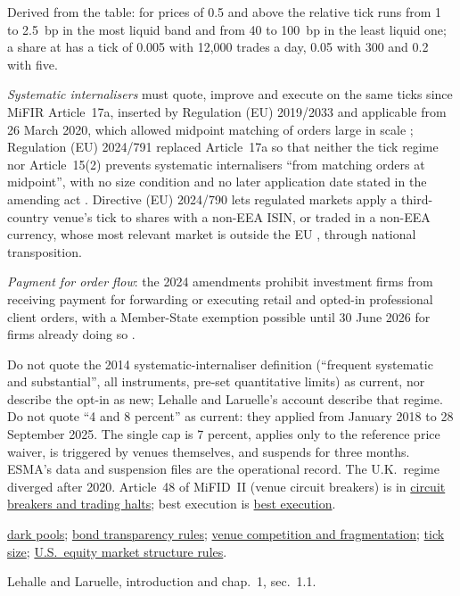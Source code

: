 \begin{qfrule}
Derived from the table: for prices of 0.5 and above the relative tick runs from 1 to 2.5~bp in the most liquid band and from 40 to 100~bp in the least liquid one; a share at  has a tick of 0.005 with 12{,}000 trades a day, 0.05 with 300 and 0.2 with five.

\emph{Systematic internalisers} must quote, improve and execute on the same ticks since MiFIR Article~17a, inserted by Regulation (EU) 2019/2033 and applicable from 26 March 2020, which allowed midpoint matching of orders large in scale \citep[Art.~63(3) and Art.~67(3)(a)]{eu-reg-2019-2033}; Regulation (EU) 2024/791 replaced Article~17a so that neither the tick regime nor Article~15(2) prevents systematic internalisers ``from matching orders at midpoint'', with no size condition and no later application date stated in the amending act \citep[Art.~1(16)]{ex-eu-mifir-review-2024}. Directive (EU) 2024/790 lets regulated markets apply a third-country venue's tick to shares with a non-EEA ISIN, or traded in a non-EEA currency, whose most relevant market is outside the EU \citep[Art.~1(8), amending Art.~49(2)]{eu-dir-2024-790}, through national transposition.

\emph{Payment for order flow}: the 2024 amendments prohibit investment firms from receiving payment for forwarding or executing retail and opted-in professional client orders, with a Member-State exemption possible until 30 June 2026 for firms already doing so \citep[Art.~1, new MiFIR Art.~39a]{ex-eu-mifir-review-2024}.

 Do not quote the 2014 systematic-internaliser definition (``frequent systematic and substantial'', all instruments, pre-set quantitative limits) as current, nor describe the opt-in as new; Lehalle and Laruelle's account describe that regime. Do not quote ``4 and 8 percent'' as current: they applied from January 2018 to 28 September 2025. The single cap is 7 percent, applies only to the reference price waiver, is triggered by venues themselves, and suspends for three months. ESMA's data and suspension files are the operational record. The U.K.\ regime diverged after 2020. Article~48 of MiFID~II (venue circuit breakers) is in \hyperref[mech:circuit-breakers-trading-halts]{circuit breakers and trading halts}; best execution is \hyperref[def:best-execution]{best execution}.

 \hyperref[def:dark-pools-crossing]{dark pools}; \hyperref[rule:us-eu-bond-transparency]{bond transparency rules}; \hyperref[mech:venue-competition-fragmentation]{venue competition and fragmentation}; \hyperref[def:tick-size]{tick size}; \hyperref[rule:us-equity-market-structure]{U.S.\ equity market structure rules}.

 Lehalle and Laruelle, introduction and chap.~1, sec.~1.1.

\end{qfrule}

